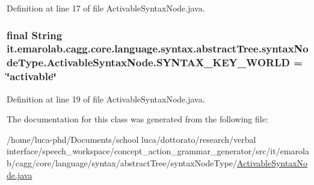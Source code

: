 Definition at line 17 of file Activable\-Syntax\-Node.\-java.

\hypertarget{classit_1_1emarolab_1_1cagg_1_1core_1_1language_1_1syntax_1_1abstractTree_1_1syntaxNodeType_1_1ActivableSyntaxNode_af6a2bd9146e74161317d574e98ae2dc1}{
\subsubsection[{S\-Y\-N\-T\-A\-X\-\_\-\-K\-E\-Y\-\_\-\-W\-O\-R\-L\-D}]{\setlength{\rightskip}{0pt plus 5cm}final String it.\-emarolab.\-cagg.\-core.\-language.\-syntax.\-abstract\-Tree.\-syntax\-Node\-Type.\-Activable\-Syntax\-Node.\-S\-Y\-N\-T\-A\-X\-\_\-\-K\-E\-Y\-\_\-\-W\-O\-R\-L\-D = \char`\"{}activable\char`\"{}\hspace{0.3cm}{\ttfamily [static]}}}\label{classit_1_1emarolab_1_1cagg_1_1core_1_1language_1_1syntax_1_1abstractTree_1_1syntaxNodeType_1_1ActivableSyntaxNode_af6a2bd9146e74161317d574e98ae2dc1}


Definition at line 19 of file Activable\-Syntax\-Node.\-java.



The documentation for this class was generated from the following file\-:\begin{DoxyCompactItemize}
\item 
/home/luca-\/phd/\-Documents/school luca/dottorato/research/verbal interface/speech\-\_\-workspace/concept\-\_\-action\-\_\-grammar\-\_\-generator/src/it/emarolab/cagg/core/language/syntax/abstract\-Tree/syntax\-Node\-Type/\hyperlink{ActivableSyntaxNode_8java}{Activable\-Syntax\-Node.\-java}\end{DoxyCompactItemize}
